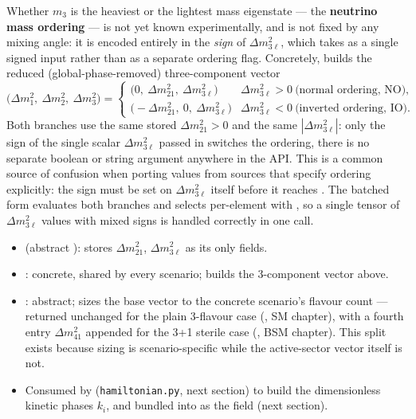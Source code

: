 \begin{notebox}[title={Normal and Inverted Ordering}]
Whether $m_3$ is the heaviest or the lightest mass eigenstate --- the
\textbf{neutrino mass ordering} --- is not yet known experimentally, and is
not fixed by any mixing angle: it is encoded entirely in the \emph{sign} of
$\Delta m^2_{3\ell}$, which  takes as a single signed
input rather than as a separate ordering flag. Concretely,
 builds the reduced (global-phase-removed)
three-component vector
\begin{equation}
  \bigl(\Delta m^2_1,\ \Delta m^2_2,\ \Delta m^2_3\bigr)
  = \begin{cases}
      \bigl(0,\ \Delta m^2_{21},\ \Delta m^2_{3\ell}\bigr) & \Delta m^2_{3\ell} > 0\ \text{(normal ordering, NO)},\\[2pt]
      \bigl(-\Delta m^2_{21},\ 0,\ \Delta m^2_{3\ell}\bigr) & \Delta m^2_{3\ell} < 0\ \text{(inverted ordering, IO)}.
    \end{cases}
\end{equation}
Both branches use the same stored $\Delta m^2_{21}>0$ and the same
$|\Delta m^2_{3\ell}|$: only the sign of the single scalar
$\Delta m^2_{3\ell}$ passed in switches the ordering, there is no separate
boolean or string argument anywhere in the API. This is a common source of
confusion when porting values from sources that specify ordering
explicitly: the sign must be set on $\Delta m^2_{3\ell}$ itself before it
reaches . The batched form evaluates both branches and
selects per-element with , so a single tensor of
$\Delta m^2_{3\ell}$ values with mixed signs is handled correctly in one
call.
\end{notebox}

\begin{implbox}
\begin{itemize}
  \item {} (abstract ): stores
    $\Delta m^2_{21}$, $\Delta m^2_{3\ell}$ as its only fields.
  \item {}: concrete, shared by every
    scenario; builds the 3-component vector above.
  \item {}: abstract; sizes the base vector to
    the concrete scenario's flavour count --- returned unchanged for the
    plain 3-flavour case (, SM chapter), with a
    fourth entry $\Delta m^2_{41}$ appended for the 3+1 sterile case
    (, BSM chapter). This split exists because
    sizing is scenario-specific while the active-sector vector itself is
    not.
  \item Consumed by  (\texttt{hamiltonian.py},
    next section) to build the dimensionless kinetic phases $k_i$, and bundled into
     as the  field
    (next section).
\end{itemize}
\end{implbox}


